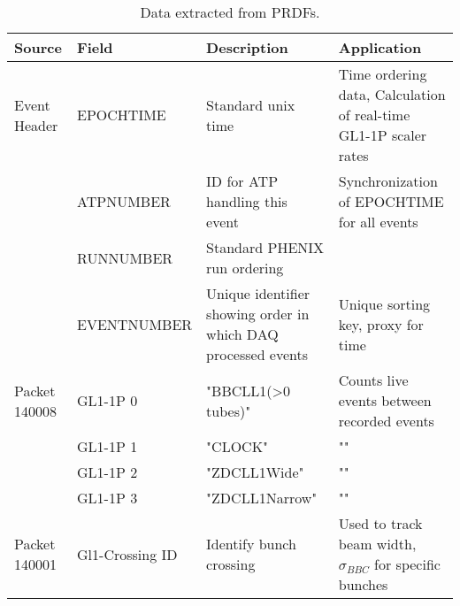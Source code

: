 \begin{sidewaystable}
\centering
\begin{tabular}{ l l p{6cm} p{8cm} }
\toprule
\textbf{Source} & \textbf{Field} & \textbf{Description} & \textbf{Application} \\
\midrule 
Event Header & EPOCHTIME & Standard unix time & Time ordering data, Calculation of real-time GL1-1P scaler rates \\
 & ATPNUMBER & ID for ATP handling this event & Synchronization of EPOCHTIME for all events \\
 & RUNNUMBER & Standard PHENIX run ordering & \\
 & EVENTNUMBER & Unique identifier showing order in which DAQ processed events & Unique sorting key, proxy for time \\
Packet 140008 & GL1-1P 0 & "BBCLL1(\textgreater0 tubes)" & Counts live events between recorded events \\
 & GL1-1P 1 & "CLOCK" & "" \\
 & GL1-1P 2 & "ZDCLL1Wide" & "" \\
 & GL1-1P 3 & "ZDCLL1Narrow" & "" \\
Packet 140001 & Gl1-Crossing ID & Identify bunch crossing  & Used to track beam width, $\sigma_{BBC}$  for specific bunches\\
\bottomrule
\end{tabular}
\caption{ Data extracted from PRDFs. }
\label{tab:prdf_data_summary}
\end{sidewaystable}
